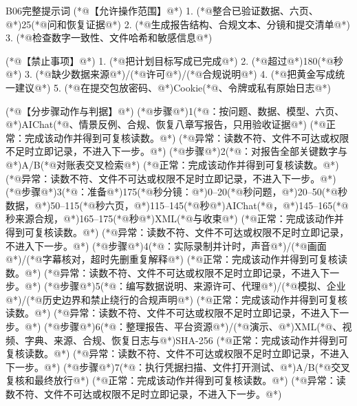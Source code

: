 \documentclass[UTF8,openany,zihao=-4]{ctexbook}
\renewcommand{\_}{\textunderscore\allowbreak}
\begin{document}
\begin{PromptBox}{B06完整提示词}
(*@{\promptcjk 【允许操作范围】}@*)
1. (*@{\promptcjk 整合已验证数据、六页、}@*)25(*@{\promptcjk 问和恢复证据}@*)
2. (*@{\promptcjk 生成报告结构、合规文本、分镜和提交清单}@*)
3. (*@{\promptcjk 检查数字一致性、文件哈希和敏感信息}@*)

(*@{\promptcjk 【禁止事项】}@*)
1. (*@{\promptcjk 把计划目标写成已完成}@*)
2. (*@{\promptcjk 超过}@*)180(*@{\promptcjk 秒}@*)
3. (*@{\promptcjk 缺少数据来源}@*)/(*@{\promptcjk 许可}@*)/(*@{\promptcjk 合规说明}@*)
4. (*@{\promptcjk 把黄金写成统一建议}@*)
5. (*@{\promptcjk 在提交包放密码、}@*)Cookie(*@{\promptcjk 、令牌或私有原始日志}@*)

(*@{\promptcjk 【分步骤动作与判据】}@*)
(*@{\promptcjk 步骤}@*)1(*@{\promptcjk ：按问题、数据、模型、六页、}@*)AIChat(*@{\promptcjk 、情景反例、合规、恢复八章写报告，只用验收证据}@*)
  (*@{\promptcjk 正常：完成该动作并得到可复核读数。}@*)
  (*@{\promptcjk 异常：读数不符、文件不可达或权限不足时立即记录，不进入下一步。}@*)
(*@{\promptcjk 步骤}@*)2(*@{\promptcjk ：对报告全部关键数字与}@*)A/B(*@{\promptcjk 对账表交叉检索}@*)
  (*@{\promptcjk 正常：完成该动作并得到可复核读数。}@*)
  (*@{\promptcjk 异常：读数不符、文件不可达或权限不足时立即记录，不进入下一步。}@*)
(*@{\promptcjk 步骤}@*)3(*@{\promptcjk ：准备}@*)175(*@{\promptcjk 秒分镜：}@*)0--20(*@{\promptcjk 秒问题，}@*)20--50(*@{\promptcjk 秒数据，}@*)50--115(*@{\promptcjk 秒六页，}@*)115--145(*@{\promptcjk 秒}@*)AIChat(*@{\promptcjk ，}@*)145--165(*@{\promptcjk 秒来源合规，}@*)165--175(*@{\promptcjk 秒}@*)XML(*@{\promptcjk 与收束}@*)
  (*@{\promptcjk 正常：完成该动作并得到可复核读数。}@*)
  (*@{\promptcjk 异常：读数不符、文件不可达或权限不足时立即记录，不进入下一步。}@*)
(*@{\promptcjk 步骤}@*)4(*@{\promptcjk ：实际录制并计时，声音}@*)/(*@{\promptcjk 画面}@*)/(*@{\promptcjk 字幕核对，超时先删重复解释}@*)
  (*@{\promptcjk 正常：完成该动作并得到可复核读数。}@*)
  (*@{\promptcjk 异常：读数不符、文件不可达或权限不足时立即记录，不进入下一步。}@*)
(*@{\promptcjk 步骤}@*)5(*@{\promptcjk ：编写数据说明、来源许可、代理}@*)/(*@{\promptcjk 模拟、企业}@*)/(*@{\promptcjk 历史边界和禁止绕行的合规声明}@*)
  (*@{\promptcjk 正常：完成该动作并得到可复核读数。}@*)
  (*@{\promptcjk 异常：读数不符、文件不可达或权限不足时立即记录，不进入下一步。}@*)
(*@{\promptcjk 步骤}@*)6(*@{\promptcjk ：整理报告、平台资源}@*)/(*@{\promptcjk 演示、}@*)XML(*@{\promptcjk 、视频、字典、来源、合规、恢复日志与}@*)SHA-256
  (*@{\promptcjk 正常：完成该动作并得到可复核读数。}@*)
  (*@{\promptcjk 异常：读数不符、文件不可达或权限不足时立即记录，不进入下一步。}@*)
(*@{\promptcjk 步骤}@*)7(*@{\promptcjk ：执行凭据扫描、文件打开测试、}@*)A/B(*@{\promptcjk 交叉复核和最终放行}@*)
  (*@{\promptcjk 正常：完成该动作并得到可复核读数。}@*)
  (*@{\promptcjk 异常：读数不符、文件不可达或权限不足时立即记录，不进入下一步。}@*)


\end{PromptBox}
\end{document}
